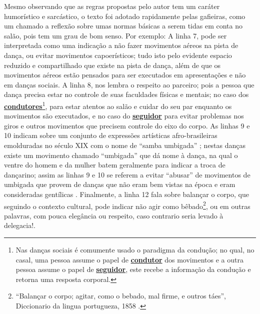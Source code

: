 Mesmo observando que as regras propostas pelo autor tem um caráter humorístico e sarcástico,
o texto foi adotado rapidamente pelas gafieiras, como um chamado a reflexão sobre umas
normas básicas a serem tidas em conta no salão, pois tem um grau de bom senso. Por exemplo: 
A linha 7, pode ser interpretada como uma indicação a 
não fazer movimentos aéreos na pista de dança,
ou  evitar movimentos capoerísticos; tudo isto
pelo evidente espacio reduzido e compartilhado que existe na pista de dança, 
além de que os movimentos aéreos estão pensados para ser
executados em apresentações e não em danças sociais. 
A linha 8, nos lembra o respeito ao parceiro; pois a pessoa que dança precisa
estar no controle de suas faculdades físicas e mentais; 
no caso dos \hyperref[def:Condutor]{\textbf{condutores}}\footnote{\label{footlab:conducao}Nas danças sociais é comumente usado o paradigma da condução; 
no qual, no casal, uma pessoa assume o papel de \hyperref[def:Condutor]{\textbf{condutor}} dos movimentos e 
a outra pessoa assume o papel de \hyperref[def:Seguidor]{\textbf{seguidor}}, este recebe a informação da condução e retorna uma resposta corporal.}, 
para estar atentos ao salão e cuidar do seu par enquanto os movimentos são executados, 
e no caso do \hyperref[def:Seguidor]{\textbf{seguidor}} para evitar problemas
nos giros e outros movimentos que precisem  controle do eixo do corpo.
As linhas 9 e 10 indicam sobre um conjunto de expressões artísticas 
afro-brasileiras emolduradas no século XIX com o nome de ``samba umbigada'' \cite[pp. 47]{diniz2008almanaque} \cite[pp. 85]{sandroni2001feitico}; nestas danças existe
um movimento chamado ``umbigada'' \cite[pp. 50]{da2015historia} que dá nome à dança, na qual o ventre do homem e da mulher batem geralmente para indicar
a troca de dançarino; assim as linhas 9 e 10 se referem a
 evitar ``abusar'' de movimentos de umbigada que provem de danças que não eram bem vistas na época e eram consideradas gentílicas \cite[pp. 85]{sandroni2001feitico}.
Finalmente,
a linha 12 fala sobre balançar o corpo, que seguindo o contexto cultural, 
pode indicar não agir como bêbado\footnote{``Balançar o corpo; agitar, como o bebado, mal firme, e outros táes'', Diccionario da lingua portugueza, 1858 \cite[pp.296]{diccionario1858}.}, ou em outras palavras,
com pouca elegância ou respeito,
caso contrario seria levado à delegacia!.



